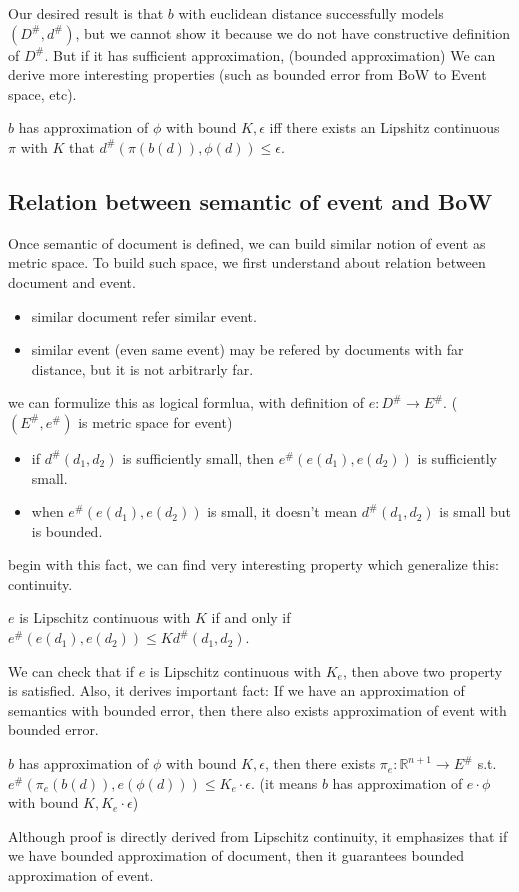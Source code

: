 Our desired result is that $b$ with euclidean distance successfully models $(D^{\#}, d^{\#})$, but we cannot show it because we do not have
constructive definition of $D^{\#}$. But if it has sufficient approximation, (bounded approximation)
We can derive more interesting properties (such as bounded error from BoW to Event space, etc).

\begin{definition}
    $b$ has approximation of $\phi$ with bound $K, \epsilon$ iff there exists an Lipshitz continuous $\pi$ with $K$ that $d^{\#}(\pi(b(d)), \phi(d)) \leq \epsilon$.
\end{definition}

\subsection{Relation between semantic of event and BoW}
Once semantic of document is defined, we can build similar notion of event as metric space. To build such space, we first understand about
relation between document and event.
\begin{itemize}
    \item similar document refer similar event.
    \item similar event (even same event) may be refered by documents with far distance, but it is not arbitrarly far.
\end{itemize}
we can formulize this as logical formlua, with definition of $e: D^{\#} \rightarrow E^{\#}$. ($(E^{\#}, e^{\#})$ is metric space for event)
\begin{itemize}
    \item if $d^{\#}(d_{1}, d_{2})$ is sufficiently small, then $e^{\#}(e(d_{1}), e(d_{2}))$ is sufficiently small.
    \item when $e^{\#}(e(d_{1}), e(d_{2}))$ is small, it doesn't mean $d^{\#}(d_{1}, d_{2})$ is small but is bounded.
\end{itemize}
begin with this fact, we can find very interesting property which generalize this: continuity.
\begin{definition}
    $e$ is Lipschitz continuous with $K$ if and only if\\ $e^{\#}(e(d_{1}), e(d_{2})) \leq K d^{\#}(d_{1}, d_{2})$.
\end{definition}

We can check that if $e$ is Lipschitz continuous with $K_{e}$, then above two property is satisfied. Also, it derives important fact:
If we have an approximation of semantics with bounded error, then there also exists approximation of event with bounded error.
\begin{theorem}
    $b$ has approximation of $\phi$ with bound $K, \epsilon$, then there exists $\pi_{e}: \mathbb{R}^{n+1} \rightarrow E^{\#}$ s.t.
    $e^{\#}(\pi_{e}(b(d)), e(\phi(d))) \leq K_{e} \cdot \epsilon$. (it means $b$ has approximation of $e \cdot \phi$ with bound $K, K_{e} \cdot \epsilon$)
\end{theorem}
Although proof is directly derived from Lipschitz continuity, it emphasizes that if we have bounded approximation of document, then it guarantees
bounded approximation of event.

